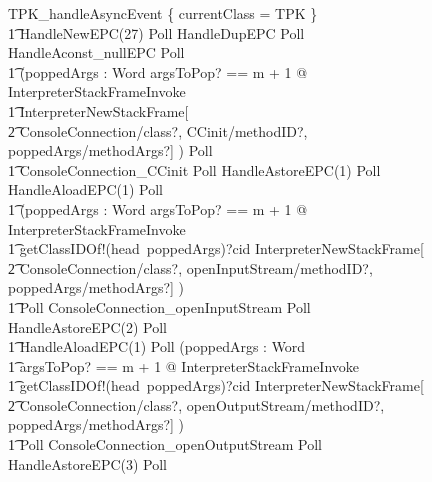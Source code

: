 \begin{figure}
  \small
  \setlength{\zedindent}{0pt}
  \setlength{\zedleftsep}{0pt}
  \setlength{\abovedisplayskip}{0pt}
  \setlength{\belowdisplayskip}{0pt}
  \setlength{\abovedisplayshortskip}{0pt}
  \setlength{\belowdisplayshortskip}{0pt}
  \begin{circus}
    TPK\_handleAsyncEvent \circdef \{ currentClass = TPK \} \circseq \\
    \t1 HandleNewEPC(27) \circseq Poll \circseq HandleDupEPC \circseq Poll \circseq  HandleAconst\_nullEPC \circseq Poll \circseq \\
    \t1 (\circvar poppedArgs : \seq Word \circspot \lschexpract \exists argsToPop? == m + 1 @ InterpreterStackFrameInvoke \rschexpract \circseq \\
    \t1 \lschexpract InterpreterNewStackFrame[\\
    \t2 ConsoleConnection/class?, CCinit/methodID?, poppedArgs/methodArgs?] \rschexpract) \circseq Poll \circseq \\
    \t1 ConsoleConnection\_CCinit \circseq Poll \circseq HandleAstoreEPC(1) \circseq Poll \circseq HandleAloadEPC(1) \circseq Poll \circseq \\
    \t1 (\circvar poppedArgs : \seq Word \circspot \lschexpract \exists argsToPop? == m + 1 @ InterpreterStackFrameInvoke \rschexpract \circseq \\
    \t1 getClassIDOf!(head~poppedArgs)?cid \then \lschexpract InterpreterNewStackFrame[ \\
    \t2 ConsoleConnection/class?, openInputStream/methodID?, poppedArgs/methodArgs?] \rschexpract) \circseq \\
    \t1 Poll \circseq ConsoleConnection\_openInputStream \circseq Poll \circseq  HandleAstoreEPC(2) \circseq Poll \circseq \\
    \t1 HandleAloadEPC(1) \circseq Poll \circseq (\circvar poppedArgs : \seq Word \circspot \\
    \t1 \lschexpract \exists argsToPop? == m + 1 @ InterpreterStackFrameInvoke \rschexpract \circseq \\
    \t1 getClassIDOf!(head~poppedArgs)?cid \then \lschexpract InterpreterNewStackFrame[\\
    \t2 ConsoleConnection/class?, openOutputStream/methodID?, poppedArgs/methodArgs?] \rschexpract) \circseq \\
    \t1 Poll \circseq ConsoleConnection\_openOutputStream \circseq Poll \circseq HandleAstoreEPC(3) \circseq Poll \circseq \\

\end{circus}
\end{figure}
